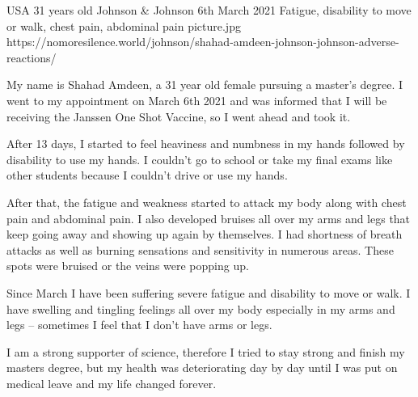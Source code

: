 {USA}
{31 years old}
{Johnson \& Johnson}
{6th March 2021}
{Fatigue, disability to move or walk, chest pain, abdominal pain}
{picture.jpg}
{https://nomoresilence.world/johnson/shahad-amdeen-johnson-johnson-adverse-reactions/}
{

My name is Shahad Amdeen, a 31 year old female pursuing a master’s degree. I
went to my appointment on March 6th 2021 and was informed that I will be
receiving the Janssen One Shot Vaccine, so I went ahead and took it.

After 13 days, I started to feel heaviness and numbness in my hands followed by
disability to use my hands. I couldn’t go to school or take my final exams like
other students because I couldn’t drive or use my hands.

After that, the fatigue and weakness started to attack my body along with chest
pain and abdominal pain. I also developed bruises all over my arms and legs that
keep going away and showing up again by themselves. I had shortness of breath
attacks as well as burning sensations and sensitivity in numerous areas. These
spots were bruised or the veins were popping up.

Since March I have been suffering severe fatigue and disability to move or
walk. I have swelling and tingling feelings all over my body especially in my
arms and legs – sometimes I feel that I don’t have arms or legs.

I am a strong supporter of science, therefore I tried to stay strong and finish
my masters degree, but my health was deteriorating day by day until I was put on
medical leave and my life changed forever.

}
